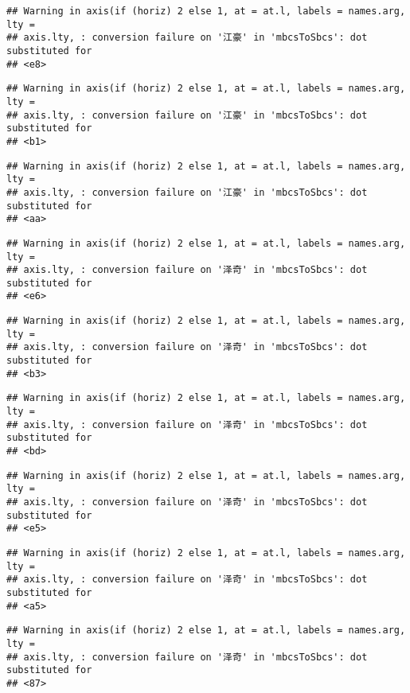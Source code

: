 \documentclass[
]{article}
\begin{document}
\begin{verbatim}
## Warning in axis(if (horiz) 2 else 1, at = at.l, labels = names.arg, lty =
## axis.lty, : conversion failure on '江豪' in 'mbcsToSbcs': dot substituted for
## <e8>
\end{verbatim}

\begin{verbatim}
## Warning in axis(if (horiz) 2 else 1, at = at.l, labels = names.arg, lty =
## axis.lty, : conversion failure on '江豪' in 'mbcsToSbcs': dot substituted for
## <b1>
\end{verbatim}

\begin{verbatim}
## Warning in axis(if (horiz) 2 else 1, at = at.l, labels = names.arg, lty =
## axis.lty, : conversion failure on '江豪' in 'mbcsToSbcs': dot substituted for
## <aa>
\end{verbatim}

\begin{verbatim}
## Warning in axis(if (horiz) 2 else 1, at = at.l, labels = names.arg, lty =
## axis.lty, : conversion failure on '泽奇' in 'mbcsToSbcs': dot substituted for
## <e6>
\end{verbatim}

\begin{verbatim}
## Warning in axis(if (horiz) 2 else 1, at = at.l, labels = names.arg, lty =
## axis.lty, : conversion failure on '泽奇' in 'mbcsToSbcs': dot substituted for
## <b3>
\end{verbatim}

\begin{verbatim}
## Warning in axis(if (horiz) 2 else 1, at = at.l, labels = names.arg, lty =
## axis.lty, : conversion failure on '泽奇' in 'mbcsToSbcs': dot substituted for
## <bd>
\end{verbatim}

\begin{verbatim}
## Warning in axis(if (horiz) 2 else 1, at = at.l, labels = names.arg, lty =
## axis.lty, : conversion failure on '泽奇' in 'mbcsToSbcs': dot substituted for
## <e5>
\end{verbatim}

\begin{verbatim}
## Warning in axis(if (horiz) 2 else 1, at = at.l, labels = names.arg, lty =
## axis.lty, : conversion failure on '泽奇' in 'mbcsToSbcs': dot substituted for
## <a5>
\end{verbatim}

\begin{verbatim}
## Warning in axis(if (horiz) 2 else 1, at = at.l, labels = names.arg, lty =
## axis.lty, : conversion failure on '泽奇' in 'mbcsToSbcs': dot substituted for
## <87>
\end{verbatim}
\end{document}
